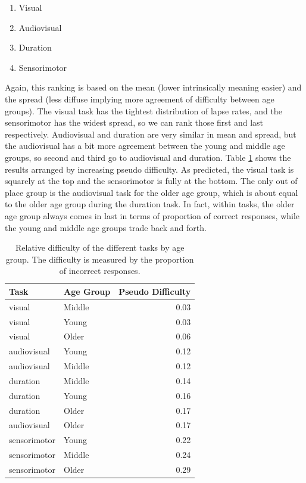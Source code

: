 \documentclass[11pt, oneside, openany]{scrbook}
\providecommand{\tightlist}{%
  \setlength{\itemsep}{0pt}\setlength{\parskip}{0pt}}
\begin{document}
\begin{enumerate}
\def\labelenumi{\arabic{enumi}.}
\tightlist
\item
  Visual
\item
  Audiovisual
\item
  Duration
\item
  Sensorimotor
\end{enumerate}

Again, this ranking is based on the mean (lower intrinsically meaning easier) and the spread (less diffuse implying more agreement of difficulty between age groups). The visual task has the tightest distribution of lapse rates, and the sensorimotor has the widest spread, so we can rank those first and last respectively. Audiovisual and duration are very similar in mean and spread, but the audiovisual has a bit more agreement between the young and middle age groups, so second and third go to audiovisual and duration. Table \ref{tab:ch050-Orange-Tigerfish} shows the results arranged by increasing pseudo difficulty. As predicted, the visual task is squarely at the top and the sensorimotor is fully at the bottom. The only out of place group is the audiovisual task for the older age group, which is about equal to the older age group during the duration task. In fact, within tasks, the older age group always comes in last in terms of proportion of correct responses, while the young and middle age groups trade back and forth.

\begin{table}[!h]

\caption{\label{tab:ch050-Orange-Tigerfish}Relative difficulty of the different tasks by age group. The difficulty is measured by the proportion of incorrect responses.}
\centering
\begin{tabular}[t]{llr}
\toprule
Task & Age Group & Pseudo Difficulty\\
\midrule
visual & Middle & 0.03\\
visual & Young & 0.03\\
visual & Older & 0.06\\
audiovisual & Young & 0.12\\
audiovisual & Middle & 0.12\\
\addlinespace
duration & Middle & 0.14\\
duration & Young & 0.16\\
duration & Older & 0.17\\
audiovisual & Older & 0.17\\
sensorimotor & Young & 0.22\\
\addlinespace
sensorimotor & Middle & 0.24\\
sensorimotor & Older & 0.29\\
\bottomrule
\end{tabular}
\end{table}
\end{document}
